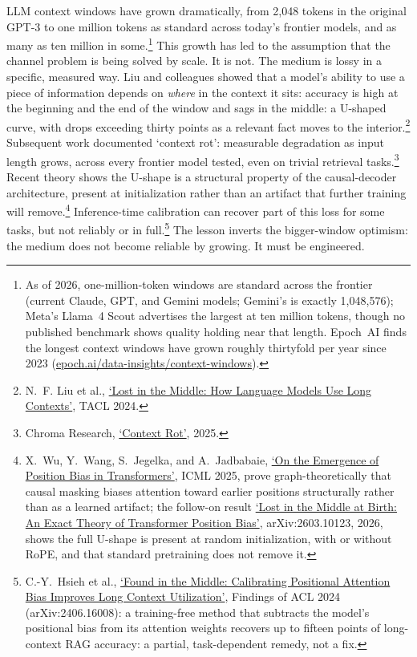 \documentclass[11pt, a4paper]{article}
\begin{document}
LLM context windows have grown dramatically, from 2,048 tokens in the original GPT-3 to
one million tokens as standard across today's frontier models, and as many as ten million
in some.\footnote{As of 2026, one-million-token windows are standard across the frontier
(current Claude, GPT, and Gemini models; Gemini's is exactly 1,048,576); Meta's Llama~4
Scout advertises the largest at ten million tokens, though no published benchmark shows
quality holding near that length. Epoch~AI finds the longest context windows have grown
roughly thirtyfold per year since 2023
(\href{https://epoch.ai/data-insights/context-windows}{epoch.ai/data-insights/context-windows}).}
This growth has led to the assumption
that the channel problem is being solved by scale. It is not. The medium is lossy in a
specific, measured way. Liu and colleagues showed that a model's ability to use a piece
of information depends on \emph{where} in the context it sits: accuracy is high at the
beginning and the end of the window and sags in the middle: a U-shaped curve, with drops
exceeding thirty points as a relevant fact moves to the
interior.\footnote{N.~F. Liu et al., \href{https://aclanthology.org/2024.tacl-1.9/}{`Lost in the Middle: How Language Models Use Long Contexts'}, TACL 2024.}
Subsequent work documented `context rot': measurable degradation as input length grows,
across every frontier model tested, even on trivial retrieval
tasks.\footnote{Chroma Research, \href{https://research.trychroma.com/context-rot}{`Context Rot'}, 2025.}
Recent theory shows the U-shape is a structural property of the causal-decoder
architecture, present at initialization rather than an artifact that further training
will remove.\footnote{X.~Wu, Y.~Wang, S.~Jegelka, and A.~Jadbabaie,
\href{https://proceedings.mlr.press/v267/wu25ad.html}{`On the Emergence of Position Bias
in Transformers'}, ICML 2025, prove graph-theoretically that causal masking biases
attention toward earlier positions structurally rather than as a learned artifact; the
follow-on result \href{https://arxiv.org/abs/2603.10123}{`Lost in the Middle at Birth: An
Exact Theory of Transformer Position Bias'}, arXiv:2603.10123, 2026, shows the full
U-shape is present at random initialization, with or without RoPE, and that standard
pretraining does not remove it.} Inference-time calibration can recover part of this loss
for some tasks, but not reliably or in full.\footnote{C.-Y.~Hsieh et al.,
\href{https://arxiv.org/abs/2406.16008}{`Found in the Middle: Calibrating Positional
Attention Bias Improves Long Context Utilization'}, Findings of ACL 2024
(arXiv:2406.16008): a training-free method that subtracts the model's positional bias from
its attention weights recovers up to fifteen points of long-context RAG accuracy: a
partial, task-dependent remedy, not a fix.} The lesson inverts the bigger-window optimism: the medium
does not become reliable by growing. It must be engineered.
\end{document}

